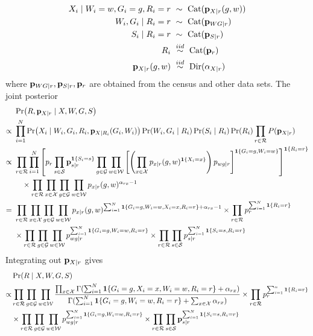 \documentclass[11pt]{article}
\theoremstyle{plain}
\newcommand{\iid}{\mathrel{\stackrel{iid}{\sim}}}
\newcommand{\Dir}{\mathrm{Dir}}
\newcommand{\Cat}{\mathrm{Cat}}
\newcommand{\cW}{\mathcal{W}}
\newcommand{\cS}{\mathcal{S}}
\newcommand{\cR}{\mathcal{R}}
\newcommand{\cG}{\mathcal{G}}
\newcommand{\cX}{\mathcal{X}}
\begin{document}
\begin{align}
  X_i \mid W_i =w, G_i = g,  R_i = r \ &\sim \ \Cat(\vb p_{X|r}(g,w))  \\
  W_i, G_i \mid R_i  = r \ &\sim \ \Cat(\vb p_{WG|r}) \\
  S_i \mid R_i = r \ &\sim \ \Cat(\vb p_{S|r})  \\
  R_i \ &\iid \ \Cat(\vb p_r) \\
  \vb p_{X|r}(g,w) \ &\iid \ \Dir(\vb\alpha_{X|r})
\end{align}
where $\vb p_{WG|r}, \vb p_{S|r}, \vb p_r$ are obtained from the census and other
data sets.  The joint posterior
\begin{align}
  & \Pr(R, \vb p_{X|r} \mid X, W, G, S) \\
  \propto \ & \prod_{i=1}^N \Pr(X_i \mid W_i, G_i,
  R_i, \vb p_{X|R_i}(G_i, W_i))\Pr(W_i, G_i \mid R_i) \Pr(S_i \mid R_i) \Pr(R_i) \prod_{r
              \in \cR} P(\vb p_{X|r}) \\
  \propto \ & \prod_{r \in \cR} \prod_{i=1}^N  \left[p_r \prod_{s \in \cS}
              \vb p_{s|r}^{\mathbf{1}\{S_i = s\}} \prod_{g \in \cG} \prod_{w \in \cW}
             \left[ \left(\prod_{x \in \cX} p_{x|r}(g,w)^{\mathbf{1}\{X_i = x\}}\right)
              p_{wg|r}\right]^{\mathbf{1}\{G_i = g, W_i =
              w\}} \right]^{\mathbf{1}\{R_i = r\}} \\
  & \quad \times \prod_{r \in \cR} \prod_{x \in \cX} \prod_{g \in \cG}
    \prod_{w \in \cW} p_{x|r}(g,w)^{\alpha_{rx}-1} \\
  = \ &  \prod_{r \in \cR} \prod_{x \in \cX} \prod_{g \in \cG}
    \prod_{w \in \cW} p_{x|r}(g,w)^{\sum_{i=1}^N \mathbf{1}\{G_i = g,
        W_i = w, X_i = x, R_i = r\} + \alpha_{rx}-1} \times \prod_{r
        \in \cR} p_r^{\sum_{i=1}^N \mathbf{1}\{R_i = r\}} \\
  & \times \prod_{r \in \cR} \prod_{g \in \cG}
    \prod_{w \in \cW}p_{wg|r}^{\sum_{i=1}^N \mathbf{1}\{G_i = g,
        W_i = w, R_i = r\}} \times \prod_{r  \in \cR} \prod_{s \in \cS}
    p_{s|r}^{\sum_{i=1}^N \mathbf{1}\{S_i = s, R_i = r\}}
\end{align}
Integrating out $\vb p_{X|r}$ gives
\begin{align}
  &  \Pr(R \mid X, W, G, S) \\
\propto  & \prod_{r \in \cR} \prod_{g \in \cG}
    \prod_{w \in \cW} \frac{\prod_{x \in \cX}\Gamma(\sum_{i=1}^N \mathbf{1}\{G_i =
           g, X_i = x,  W_i = w, R_i = r\} + \alpha_{rx})}{\Gamma(\sum_{i=1}^N
           \mathbf{1}\{G_i = g,
           W_i = w, R_i = r\} + \sum_{x\in\cX} \alpha_{rx})} \times \prod_{r
        \in \cR} p_r^{\sum_{i=1}^n \mathbf{1}\{R_i = r\}} \\
  & \times \prod_{r \in \cR} \prod_{g \in \cG}
    \prod_{w \in \cW}p_{wg|r}^{\sum_{i=1}^N \mathbf{1}\{G_i = g,
        W_i = w, R_i = r\}} \times \prod_{r  \in \cR} \prod_{s \in \cS}
    \vb p_{s|r}^{\sum_{i=1}^N \mathbf{1}\{S_i = s, R_i = r\}}
\end{align}
\end{document}
